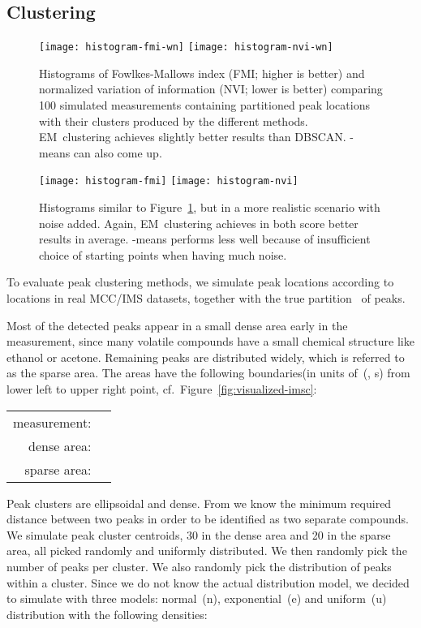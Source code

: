\documentclass{article}
\begin{document}
\subsection{Clustering}
\label{sec:eval:clustering}

\begin{figure}[t]\centering
\texttt{[image: histogram-fmi-wn]}
\texttt{[image: histogram-nvi-wn]}
\caption{
Histograms of Fowlkes-Mallows index (FMI; higher is better) and normalized variation of information (NVI; lower is better) comparing 100 simulated measurements containing partitioned peak locations with their clusters produced by the different methods.
EM~clustering achieves slightly better results than DBSCAN.
-means can also come up.
}
\label{fig:clusterresultswn}
\end{figure}

\begin{figure}[t]\centering
\texttt{[image: histogram-fmi]}
\texttt{[image: histogram-nvi]}
\caption{
Histograms similar to Figure~\ref{fig:clusterresultswn}, but in a more realistic scenario with noise added.
Again, EM~clustering achieves in both score better results in average.
-means performs less well because of insufficient choice of starting points when having much noise.
}
\label{fig:clusterresults}
\end{figure}


To evaluate peak clustering methods, we simulate peak locations according to locations in real MCC/IMS datasets, together with the true partition~ of peaks.

Most of the detected peaks appear in a small dense area early in the measurement, since many volatile compounds have a small chemical structure like ethanol or acetone.
Remaining peaks are distributed widely, which is referred to as the sparse area.
The areas have the following boundaries(in units of~(, s) from lower left to upper right point, cf.\ Figure~\ref{fig:visualized-imsc}:
\begin{center}\begin{tabular}{r@{ }l}
measurement: & \\
dense area: & \\
sparse area: & 
\end{tabular}\end{center}

Peak clusters are ellipsoidal and dense.
From \cite{bodeker2008peak} we know the minimum required distance between two peaks in order to be identified as two separate compounds.
We simulate peak cluster centroids, 30 in the dense area and 20 in the sparse area, all picked randomly and uniformly distributed.
We then randomly pick the number of peaks per cluster.
We also randomly pick the distribution of peaks within a cluster.
Since we do not know the actual distribution model, we decided to simulate with three models: normal~(n), exponential~(e) and uniform~(u) distribution with the following densities:
\end{document}
